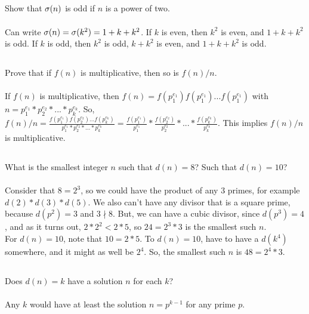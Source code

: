 \documentclass{article}
\begin{document}
\subsection{}
Show that $\sigma(n)$ is odd if $n$ is a power of two.\\~\\
Can write $\sigma(n) = \sigma(k^2) = 1 + k + k^2$.
If $k$ is even, then $k^2$ is even, and $1 + k + k^2$ is odd.
If $k$ is odd, then $k^2$ is odd, $k + k^2$ is even, and $1 + k + k^2$ is odd.

\subsection{}
Prove that if $f(n)$ is multiplicative, then so is $f(n)/n$.\\~\\
If $f(n)$ is multiplicative, then $f(n) = f(p_1^{e_1})f(p_1^{e_1})...f(p_1^{e_1})$
with $n = p_1^{e_1}*p_2^{e_2}*...*p_k^{e_k}$.
So, $f(n)/n =
\frac{f(p_1^{e_1})f(p_2^{e_2})...f(p_k^{e_k})}{p_1^{e_1}*p_2^{e_2}*...*p_k^{e_k}}
= \frac{f(p_1^{e_1})}{p_1^{e_1}}*\frac{f(p_2^{e_2})}{p_2^{e_2}}
*...*\frac{f(p_k^{e_k})}{p_k^{e_k}}$.
This implies $f(n)/n$ is multiplicative.

\subsection{}
What is the smallest integer $n$ such that $d(n) = 8$? Such that $d(n) = 10$?\\~\\
Consider that $8 = 2^3$, so we could have the product of any 3 primes,
for example $d(2)*d(3)*d(5)$. We also can't have any divisor that is a
square prime, because $d(p^2) = 3$ and $3 \nmid 8$.
But, we can have a cubic divisor, since $d(p^3) = 4$,
and as it turns out, $2 * 2^2 < 2 * 5$, so $24 = 2^3 * 3$ is the smallest such $n$.\\
For $d(n) = 10$, note that $10 = 2 * 5$.
To $d(n) = 10$, have to have a $d(k^4)$ somewhere, and it might as well be $2^4$.
So, the smallest such $n$ is $48 = 2^4 * 3$.

\subsection{}
Does $d(n) = k$ have a solution $n$ for each $k$?\\~\\
Any $k$ would have at least the solution $n = p^{k - 1}$ for any prime $p$.
\end{document}
